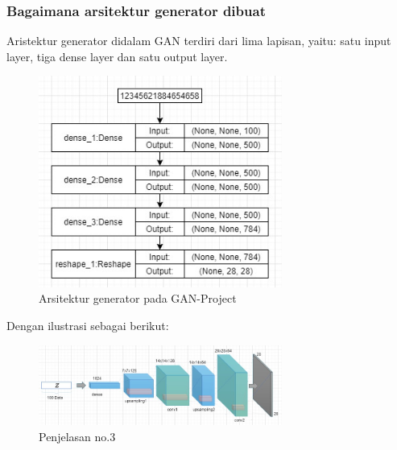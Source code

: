 \subsubsection{Bagaimana arsitektur generator dibuat}
\hfill\break
Aristektur generator didalam GAN terdiri dari lima lapisan, yaitu: satu input layer, tiga dense layer dan satu output layer.
\begin{figure}[H]
	\centering
	\includegraphics[width=8cm]{figures/1174067/8/3a.jpg}
	\caption{Arsitektur generator pada GAN-Project}
\end{figure}
Dengan ilustrasi sebagai berikut:
\begin{figure}[H]
	\centering
	\includegraphics[width=8cm]{figures/1174067/8/3.jpg}
	\caption{Penjelasan no.3}
\end{figure}

